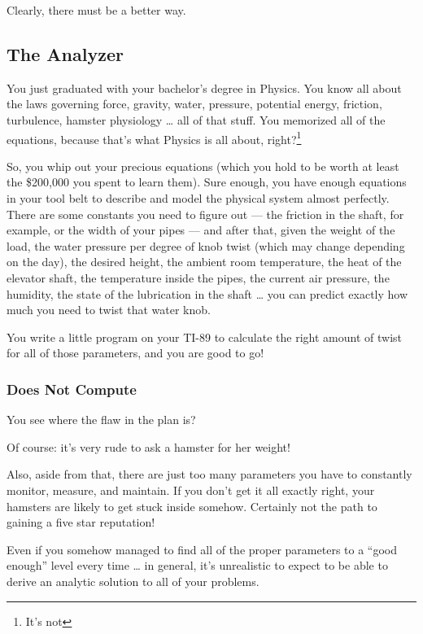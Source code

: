 \documentclass[]{article}
\begin{document}
Clearly, there must be a better way.

\hypertarget{the-analyzer}{%
\subsection{The Analyzer}\label{the-analyzer}}

You just graduated with your bachelor's degree in Physics. You know all about
the laws governing force, gravity, water, pressure, potential energy, friction,
turbulence, hamster physiology \ldots{} all of that stuff. You memorized all of
the equations, because that's what Physics is all about, right?\footnote{It's
  not}

So, you whip out your precious equations (which you hold to be worth at least
the \$200,000 you spent to learn them). Sure enough, you have enough equations
in your tool belt to describe and model the physical system almost perfectly.
There are some constants you need to figure out --- the friction in the shaft,
for example, or the width of your pipes --- and after that, given the weight of
the load, the water pressure per degree of knob twist (which may change
depending on the day), the desired height, the ambient room temperature, the
heat of the elevator shaft, the temperature inside the pipes, the current air
pressure, the humidity, the state of the lubrication in the shaft \ldots{} you
can predict exactly how much you need to twist that water knob.

You write a little program on your TI-89 to calculate the right amount of twist
for all of those parameters, and you are good to go!

\hypertarget{does-not-compute}{%
\subsubsection{Does Not Compute}\label{does-not-compute}}

You see where the flaw in the plan is?

Of course: it's very rude to ask a hamster for her weight!

Also, aside from that, there are just too many parameters you have to constantly
monitor, measure, and maintain. If you don't get it all exactly right, your
hamsters are likely to get stuck inside somehow. Certainly not the path to
gaining a five star reputation!

Even if you somehow managed to find all of the proper parameters to a ``good
enough'' level every time \ldots{} in general, it's unrealistic to expect to be
able to derive an analytic solution to all of your problems.
\end{document}
